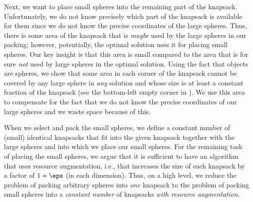 \documentclass[10pt,a4paper]{article}
\theoremstyle{plain}
\theoremstyle{plain}
\theoremstyle{plain}
\theoremstyle{definition}
\begin{document}
Next, we want to place small spheres into the remaining part of the
knapsack. Unfortunately, we do not know precisely which part of the
knapsack is available for them since we do not know the precise coordinates
of the large spheres. Thus, there is some area of the knapsack that
is \emph{maybe} used by the large spheres in our packing; however, potentially, the
optimal solution uses it for placing small spheres. Our key insight
is that this area is small compared to the area that is for
sure \emph{not} used by large spheres in the optimal solution. Using the
fact that objects are spheres, we show that some area in each corner
of the knapsack cannot be covered by any large sphere in \emph{any}
solution and whose size is at least a constant fraction of the knapsack
(see the bottom-left empty corner in ). We use this area to compensate for the fact that we
do not know the precise coordinates of our large spheres and we waste
space because of this.


When we select and pack the small spheres, we define a constant number
of (small) identical knapsacks that fit into the given knapsack together
with the large spheres and into which we place our small spheres.
For the remaining task of placing the small spheres, we argue that it is sufficient to have an algorithm
that uses resource augmentation, i.e., that increases the size of
each knapsack by a factor of $1+\eps$ (in each dimension).
Thus, on a high level, we reduce the problem of packing arbitrary spheres
into \emph{one} knapsack to the problem of packing small spheres into
a \emph{constant number} of knapsacks \emph{with resource augmentation}.
\end{document}
